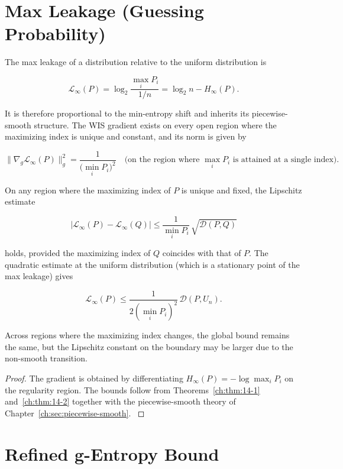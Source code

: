 \section{Max Leakage (Guessing Probability)}\label{ch:sec:max-leakage-guessing-probability}

The max leakage \cite{smith2009foundations, alvim2023information} of a
distribution relative to the uniform distribution is

\[
\mathcal L_\infty(P)
=
\log_2
\frac{
\max_i P_i
}{
1/n
}
=
\log_2 n - H_\infty(P).
\]

It is therefore proportional to the min-entropy shift and inherits its
piecewise-smooth structure.  The WIS gradient exists on every open
region where the maximizing index is unique and constant, and its norm
is given by

\[
\|\nabla_g\mathcal L_\infty(P)\|_g^2
=
\frac{
1
}{
\bigl(\min_i P_i\bigr)^2
}
\quad\text{(on the region where }\max_i P_i\text{ is attained at a
single index)}.
\]

\begin{theorem}
\label{ch:thm:max-leakage}
On any region where the maximizing index of \(P\) is unique and fixed,
the Lipschitz estimate

\[
|\mathcal L_\infty(P)-\mathcal L_\infty(Q)|
\le
\frac{1}{\min_i P_i}
\,
\sqrt{\mathcal D(P,Q)}
\]

holds, provided the maximizing index of \(Q\) coincides with that of
\(P\).  The quadratic estimate at the uniform distribution (which is a
stationary point of the max leakage) gives

\[
\mathcal L_\infty(P)
\le
\frac{1}{2(\min_i P_i)^2}
\,
\mathcal D(P,U_n).
\]

Across regions where the maximizing index changes, the global bound
remains the same, but the Lipschitz constant on the boundary may be
larger due to the non-smooth transition.
\end{theorem}

\begin{proof}
The gradient is obtained by differentiating
\(H_\infty(P)=-\log\max_i P_i\) on the regularity region.  The bounds
follow from Theorems~\ref{ch:thm:14-1} and~\ref{ch:thm:14-2} together
with the piecewise-smooth theory of Chapter~\ref{ch:sec:piecewise-smooth}. \(\)
\end{proof}

\section{Refined g-Entropy Bound}\label{ch:sec:refined-g-entropy-bound}

